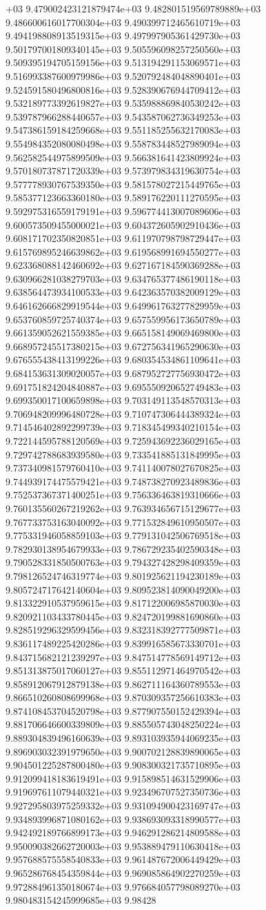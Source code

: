 +03	9.479002423121879474e+03	9.482801519569789889e+03	9.486600616017700304e+03	9.490399712465610719e+03	9.494198808913519315e+03	9.497997905361429730e+03	9.501797001809340145e+03	9.505596098257250560e+03	9.509395194705159156e+03	9.513194291153069571e+03	9.516993387600979986e+03	9.520792484048890401e+03	9.524591580496800816e+03	9.528390676944709412e+03	9.532189773392619827e+03	9.535988869840530242e+03	9.539787966288440657e+03	9.543587062736349253e+03	9.547386159184259668e+03	9.551185255632170083e+03	9.554984352080080498e+03	9.558783448527989094e+03	9.562582544975899509e+03	9.566381641423809924e+03	9.570180737871720339e+03	9.573979834319630754e+03	9.577778930767539350e+03	9.581578027215449765e+03	9.585377123663360180e+03	9.589176220111270595e+03	9.592975316559179191e+03	9.596774413007089606e+03	9.600573509455000021e+03	9.604372605902910436e+03	9.608171702350820851e+03	9.611970798798729447e+03	9.615769895246639862e+03	9.619568991694550277e+03	9.623368088142460692e+03	9.627167184590369288e+03	9.630966281038279703e+03	9.634765377486190118e+03	9.638564473934100533e+03	9.642363570382009129e+03	9.646162666829919544e+03	9.649961763277829959e+03	9.653760859725740374e+03	9.657559956173650789e+03	9.661359052621559385e+03	9.665158149069469800e+03	9.668957245517380215e+03	9.672756341965290630e+03	9.676555438413199226e+03	9.680354534861109641e+03	9.684153631309020057e+03	9.687952727756930472e+03	9.691751824204840887e+03	9.695550920652749483e+03	9.699350017100659898e+03	9.703149113548570313e+03	9.706948209996480728e+03	9.710747306444389324e+03	9.714546402892299739e+03	9.718345499340210154e+03	9.722144595788120569e+03	9.725943692236029165e+03	9.729742788683939580e+03	9.733541885131849995e+03	9.737340981579760410e+03	9.741140078027670825e+03	9.744939174475579421e+03	9.748738270923489836e+03	9.752537367371400251e+03	9.756336463819310666e+03	9.760135560267219262e+03	9.763934656715129677e+03	9.767733753163040092e+03	9.771532849610950507e+03	9.775331946058859103e+03	9.779131042506769518e+03	9.782930138954679933e+03	9.786729235402590348e+03	9.790528331850500763e+03	9.794327428298409359e+03	9.798126524746319774e+03	9.801925621194230189e+03	9.805724717642140604e+03	9.809523814090049200e+03	9.813322910537959615e+03	9.817122006985870030e+03	9.820921103433780445e+03	9.824720199881690860e+03	9.828519296329599456e+03	9.832318392777509871e+03	9.836117489225420286e+03	9.839916585673330701e+03	9.843715682121239297e+03	9.847514778569149712e+03	9.851313875017060127e+03	9.855112971464970542e+03	9.858912067912879138e+03	9.862711164360789553e+03	9.866510260808699968e+03	9.870309357256610383e+03	9.874108453704520798e+03	9.877907550152429394e+03	9.881706646600339809e+03	9.885505743048250224e+03	9.889304839496160639e+03	9.893103935944069235e+03	9.896903032391979650e+03	9.900702128839890065e+03	9.904501225287800480e+03	9.908300321735710895e+03	9.912099418183619491e+03	9.915898514631529906e+03	9.919697611079440321e+03	9.923496707527350736e+03	9.927295803975259332e+03	9.931094900423169747e+03	9.934893996871080162e+03	9.938693093318990577e+03	9.942492189766899173e+03	9.946291286214809588e+03	9.950090382662720003e+03	9.953889479110630418e+03	9.957688575558540833e+03	9.961487672006449429e+03	9.965286768454359844e+03	9.969085864902270259e+03	9.972884961350180674e+03	9.976684057798089270e+03	9.980483154245999685e+03	9.98428